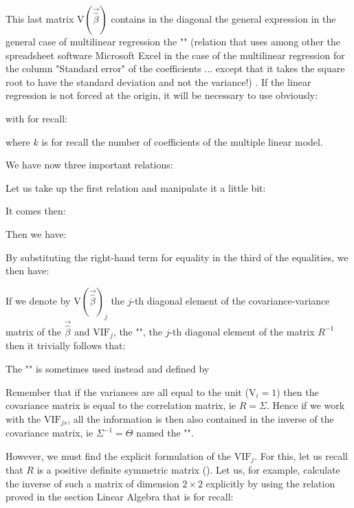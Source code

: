 	This last matrix $\text{V}\left(\vec{\hat{\beta}}\right)$ contains in the diagonal the general expression in the general case of multilinear regression the "" (relation that uses among other the spreadsheet software Microsoft Excel in the case of the multilinear regression for the column "Standard error" of the coefficients ... except that it takes the square root to have the standard deviation and not the variance!) . If the linear regression is not forced at the origin, it will be necessary to use obviously:
	
	with for recall:
	
	where $k$ is for recall the number of coefficients of the multiple linear model.

	We have now three important relations:
	
	Let us take up the first relation and manipulate it a little bit:
	
	It comes then:
	
	Then we have:
	
	By substituting the right-hand term for equality in the third of the equalities, we then have:
	
	If we denote by $\text{V}\left(\vec{\hat{\beta}}\right)_j$ the $j$-th diagonal element of the covariance-variance matrix of the $\vec{\hat{\beta}}$ and $\text{VIF}_j$, the "", the $j$-th diagonal element of the matrix $R^{-1}$ then it trivially follows that:
	
	The "" is sometimes used instead and defined by
	 
	\begin{tcolorbox}[title=Remark,colframe=black,arc=10pt]
	Remember that if the variances are all equal to the unit ($\text{V}_i=1$) then the covariance matrix is equal to the correlation matrix, ie $R=\Sigma$. Hence if we work with the $\text{VIF}_{js}$, all the information is then also contained in the inverse of the covariance matrix, ie $\Sigma^{-1}=\Theta$ named the "".
	\end{tcolorbox}
	However, we must find the explicit formulation of the $\text{VIF}_j$. For this, let us recall that $R$ is a positive definite symmetric matrix (). Let us, for example, calculate the inverse of such a matrix of dimension $2\times 2$ explicitly by using the relation proved in the section Linear Algebra that is for recall:
	
